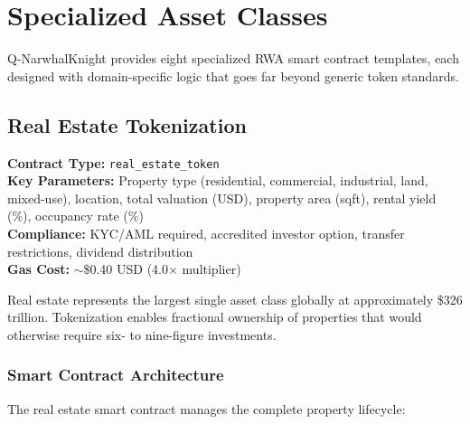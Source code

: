\documentclass[11pt,a4paper,twoside]{article}
\begin{document}
\section{Specialized Asset Classes}
\label{sec:asset-classes}

Q-NarwhalKnight provides eight specialized RWA smart contract templates, each designed with domain-specific logic that goes far beyond generic token standards.

\subsection{Real Estate Tokenization}
\label{subsec:real-estate}

\begin{keyinsight}
\textbf{Contract Type:} \texttt{real\_estate\_token}\\
\textbf{Key Parameters:} Property type (residential, commercial, industrial, land, mixed-use), location, total valuation (USD), property area (sqft), rental yield (\%), occupancy rate (\%)\\
\textbf{Compliance:} KYC/AML required, accredited investor option, transfer restrictions, dividend distribution\\
\textbf{Gas Cost:} $\sim$\$0.40 USD (4.0$\times$ multiplier)
\end{keyinsight}

Real estate represents the largest single asset class globally at approximately \$326 trillion. Tokenization enables fractional ownership of properties that would otherwise require six- to nine-figure investments.

\subsubsection{Smart Contract Architecture}

The real estate smart contract manages the complete property lifecycle:
\end{document}
